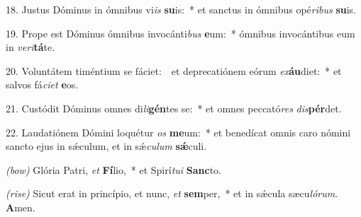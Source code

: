 18. Justus Dóminus in ómnibus vi\textit{is} \textbf{su}is:~* et sanctus in ómnibus opé\textit{ri}\textit{bus} \textbf{su}is.

19. Prope est Dóminus ómnibus invocánti\textit{bus} \textbf{e}um:~* ómnibus invocántibus eum in \textit{ve}\textit{ri}\textbf{tá}te.

20. Voluntátem timéntium se fáciet:~\GreDagger\ et deprecatiónem eórum \textit{ex}\textbf{áu}diet:~* et salvos fá\textit{ci}\textit{et} \textbf{e}os.

21. Custódit Dóminus omnes di\textit{li}\textbf{gén}tes se:~* et omnes peccató\textit{res} \textit{dis}\textbf{pér}det.

22. Laudatiónem Dómini loquétur \textit{os} \textbf{me}um:~* et benedícat omnis caro nómini sancto ejus in s\'{\ae}culum, et in s\'{\ae}\textit{cu}\textit{lum} \textbf{s\'{\ae}}culi.

\textit{(bow)} Glória Patri, \textit{et} \textbf{Fí}lio,~* et Spirí\textit{tu}\textit{i} \textbf{Sanc}to.

\textit{(rise)} Sicut erat in princípio, et nunc, \textit{et} \textbf{sem}per,~* et in s\'{\ae}cula sæcu\textit{ló}\textit{rum}. \textbf{A}men.
